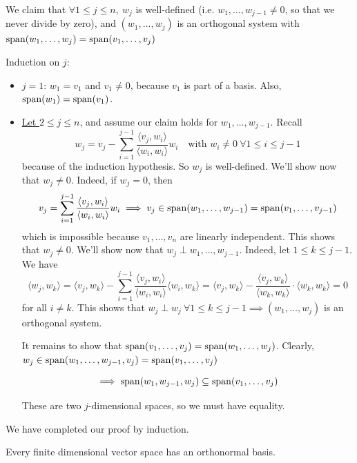 \documentclass[12pt]{article}
\begin{document}
\begin{proofbox}
    We claim that $\forall 1 \leq j \leq n,\ w_j$ is well-defined (i.e. $w_1,\dots,w_{j-1} \neq 0$, so that we never divide by zero), and $(w_1,\dots,w_j)$ is an orthogonal system with $\operatorname{span}(w_1,\dots,w_j) = \operatorname{span}(v_1,\dots,v_j)$
    
    Induction on $j$:
    \begin{itemize}
        \item \underline{$j = 1$}: $w_1 = v_1$ and $v_1 \neq 0$, because $v_1$ is part of a basis. Also, $\operatorname{span}(w_1) = \operatorname{span}(v_1)$. 
        \item \underline{Let $2 \leq j \leq n$}, and assume our claim holds for $w_1,\dots,w_{j-1}$. Recall
        $$
            w_j = v_j - \sum_{i = 1}^{j - 1} \frac{\langle v_j, w_i \rangle}{\langle w_i, w_i \rangle} w_i \quad \text{with } w_i \neq 0\ \forall 1 \leq i \leq j - 1
        $$
        because of the induction hypothesis. So $w_j$ is well-defined. We'll show now that $w_j \neq 0$. Indeed, if $w_j = 0$, then 
        $$
            v_j = \sum_{i = 1}^{j - 1} \frac{\langle v_j, w_i \rangle}{\langle w_i, w_i \rangle} w_i \implies v_j \in \operatorname{span}(w_1,\dots,w_{j-1}) = \operatorname{span}(v_1,\dots,v_{j-1})
        $$
        which is impossible because $v_1,\dots,v_n$ are linearly independent. This shows that $w_j \neq 0$. We'll show now that $w_j \perp w_1,\dots,w_{j-1}$. Indeed, let $1 \leq k \leq j - 1$. We have
        $$
            \langle w_j, w_k \rangle = \langle v_j, w_k \rangle - \sum_{i = 1}^{j - 1} \frac{\langle v_j, w_i \rangle}{\langle w_i, w_i \rangle} \langle w_i, w_k \rangle = \langle v_j, w_k \rangle - \frac{\langle v_j, w_k \rangle}{\langle w_k, w_k \rangle} \cdot \langle w_k, w_k \rangle = 0
        $$
        for all $i \neq k$. This shows that $w_j \perp w_j \ \forall 1 \leq k \leq j - 1 \implies (w_1,\dots,w_j)$  is an orthogonal system.

        It remains to show that $\operatorname{span}(v_1,\dots,v_j) = \operatorname{span}(w_1,\dots,w_j)$. Clearly, $w_j \in \operatorname{span}(w_1,\dots,w_{j-1},v_j) = \operatorname{span}(v_1,\dots,v_j)$

        $$
            \implies \operatorname{span}(w_1,w_{j-1}, w_j) \subseteq \operatorname{span}(v_1,\dots,v_j)
        $$

        These are two $j$-dimensional spaces, so we must have equality.
    \end{itemize}

    We have completed our proof by induction.
\end{proofbox}

\begin{corollary}{}{}
    Every finite dimensional vector space has an orthonormal basis.
\end{corollary}
\end{document}
